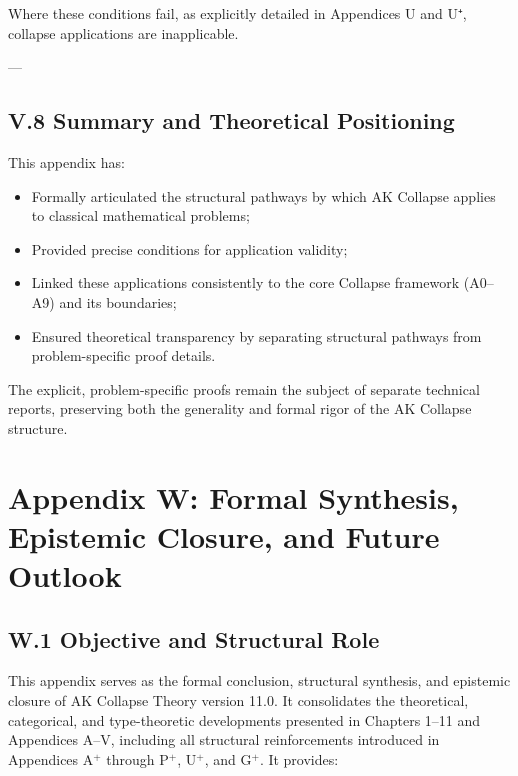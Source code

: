 \documentclass[11pt]{article}
\begin{document}
Where these conditions fail, as explicitly detailed in Appendices U and U⁺, collapse applications are inapplicable.

---

\subsection*{V.8 Summary and Theoretical Positioning}

This appendix has:

\begin{itemize}
    \item Formally articulated the structural pathways by which AK Collapse applies to classical mathematical problems;
    \item Provided precise conditions for application validity;
    \item Linked these applications consistently to the core Collapse framework (A0–A9) and its boundaries;
    \item Ensured theoretical transparency by separating structural pathways from problem-specific proof details.
\end{itemize}

The explicit, problem-specific proofs remain the subject of separate technical reports, preserving both the generality and formal rigor of the AK Collapse structure.




\section*{Appendix W: Formal Synthesis, Epistemic Closure, and Future Outlook}

\subsection*{W.1 Objective and Structural Role}

This appendix serves as the formal conclusion, structural synthesis, and epistemic closure of AK Collapse Theory version 11.0.  
It consolidates the theoretical, categorical, and type-theoretic developments presented in Chapters 1–11 and Appendices A–V, including all structural reinforcements introduced in Appendices A$^{+}$ through P$^{+}$, U$^{+}$, and G$^{+}$.  
It provides:
\end{document}
